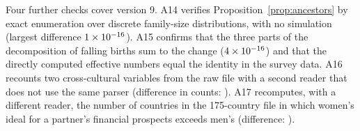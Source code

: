 Four further checks cover version 9. A14 verifies Proposition~\ref{prop:ancestors} by exact enumeration over discrete
family-size distributions, with no simulation (largest difference $1\times10^{-16}$). A15 confirms that the three parts of the
decomposition of falling births sum to the change ($4\times10^{-16}$) and that the directly computed effective numbers equal the
identity in the survey data. A16 recounts two cross-cultural variables from the raw file with a second reader that does
not use the same parser (difference in counts: \AudCultures). A17 recomputes, with a different reader, the number of
countries in the 175-country file in which women's ideal for a partner's financial prospects exceeds men's (difference:
\AudWorldSign).
